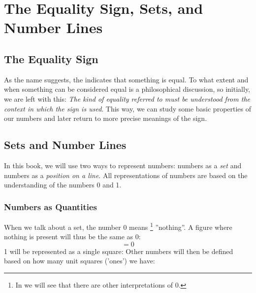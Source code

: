




	\newpage
	\section{The Equality Sign, Sets, and Number Lines}
	\subsection*{The Equality Sign}
	As the name suggests, the  
	\sym{$ = $}
	indicates that something is equal. To what extent and when something can be considered equal is a philosophical discussion, so initially, we are left with this: \textsl{The kind of equality
		\sym{$ = $}
		referred to must be understood from the context in which the sign is used}. This way, we can study some basic properties of our numbers and later return to more precise meanings of the sign. \regv
	\subsection*{Sets and Number Lines}
	In this book, we will use two ways to represent numbers: numbers as a \textsl{set} and numbers as a \textsl{position on a line}. All representations of numbers are based on the understanding of the numbers 0 and 1.
	\newpage
	\subsubsection*{Numbers as Quantities}
	When we talk about a set, the number 0 means
	\footnote{In  we will see that there are other interpretations of 0.}
	''nothing''. A figure where nothing is present will thus be the same as 0:
	\[ =0 \]
	1 will be represented as a single square:
	Other numbers will then be defined based on how many unit squares ('ones') we have: \vs
